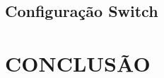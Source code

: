 \documentclass[12pt, brazil, ruledheader, pnumromarab,normaltoc]{abnt}
\begin{document}
\section{Configuração Switch}


\chapter{CONCLUSÃO}

%
%
%
\end{document}
